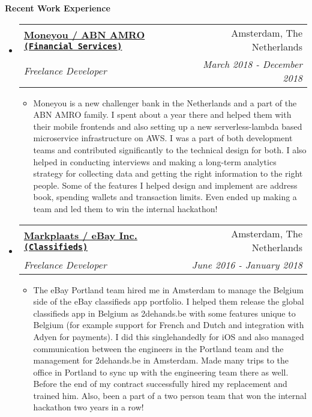 \documentclass[letterpaper,11pt]{article}
\makeatletter
\newcommand{\resitem}[1]{\item #1 \vspace{-2pt}}
\newcommand{\resheading}[1]{{\large \colorbox{mygrey}{\begin{minipage}{\textwidth}{\textbf{#1 \vphantom{p\^{E}}}}\end{minipage}}}}
\newcommand{\ressubheading}[4]{
\begin{tabular*}{7.0in}{l@{\extracolsep{\fill}}r}
    \textbf{#1} & #2 \\
    \textit{#3} & \textit{#4} \\
\end{tabular*}\vspace{-6pt}}
\makeatother
\begin{document}
\vspace{0.2in}

\resheading{Recent Work Experience}
\begin{itemize}

\item
    \ressubheading{\href{https://www.moneyou.nl/}{Moneyou / ABN AMRO \texttt{(Financial Services)}}}{Amsterdam, The Netherlands}{Freelance Developer}{March 2018 - December 2018}
    \begin{itemize}
        \vspace{0.05in}
        \resitem{ Moneyou is a new challenger bank in the Netherlands and a part of the ABN AMRO family. I spent about a year there and helped them with their mobile frontends and also setting up a new serverless-lambda based microservice infrastructure on AWS. I was a part of both development teams  and contributed significantly to the technical design for both. I also helped in conducting interviews and making a long-term analytics strategy for collecting data and getting the right information to the right people.  Some of the features I helped design and implement are address book, spending wallets and transaction limits. Even ended up making a team and led them to win the internal hackathon! }
    \end{itemize}

\vspace{0.in}

\item
    \ressubheading{\href{https://www.ebay.com/}{Markplaats / eBay Inc. \texttt{(Classifieds)}}}{Amsterdam, The Netherlands}{Freelance Developer}{June 2016 - January 2018}
    \begin{itemize}
        \vspace{0.05in}
        \resitem{ The eBay Portland team hired me in Amsterdam to manage the Belgium side of the eBay classifieds app portfolio. I helped them release the global classifieds app in Belgium as 2dehands.be with some features unique to Belgium (for example support for French and Dutch and integration with Adyen for payments). I did this singlehandedly for iOS and also managed communication between the engineers in the Portland team and the management for 2dehands.be in Amsterdam. Made many trips to the office in Portland to sync up with the engineering team there as well. Before the end of my contract successfully hired my replacement and trained him. Also, been a part of a two person team that won the internal hackathon two years in a row! }
    \end{itemize}
    

\end{itemize}
\end{document}
